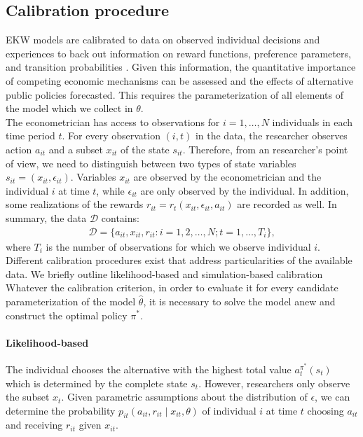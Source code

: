 \subsection{Calibration procedure}\label{Estimation}
EKW models are calibrated to data on observed individual decisions and experiences to back out information on reward functions, preference parameters, and transition probabilities \citep{Davidson.2003,Gourieroux.1996}. Given this information, the quantitative importance of competing economic mechanisms can be assessed and the effects of alternative public policies forecasted. This requires the parameterization of all elements of the model which we collect in $\theta$.\\

\noindent The econometrician has access to observations for $i = 1, \hdots, N$ individuals in each time period $t$. For every observation $(i, t)$ in the data, the researcher observes action $a_{it}$ and a subset $x_{it}$ of the state $s_{it}$. Therefore, from an researcher's point of view, we need to distinguish between two types of state variables $s_{it} = (x_{it}, \epsilon_{it})$. Variables $x_{it}$ are observed by the econometrician and the individual $i$ at time $t$, while $\epsilon_{it}$ are only observed by the individual. In addition, some realizations of the rewards $r_{it} = r_t(x_{it}, \epsilon_{it}, a_{it})$ are recorded as well. In summary, the data $\mathcal{D}$ contains:
%
\begin{align*}
  \mathcal{D} = \{a_{it}, x_{it}, r_{it}: i = 1,2, \hdots, N; t = 1, \hdots, T_i\},
\end{align*}
where $T_i$ is the number of observations for which we observe individual $i$.\\

\noindent Different calibration procedures exist that address particularities of the available data. We briefly outline likelihood-based and simulation-based calibration  Whatever the calibration criterion, in order to evaluate it for every candidate parameterization of the model $\hat{\theta}$, it is necessary to solve the model anew and construct the optimal policy $\pi^*$. 

\paragraph{Likelihood-based} The individual chooses the alternative with the highest total value $a_t^{\pi^*}(s_t)$ which is determined by the complete state $s_t$. However, researchers only observe the subset $x_t$. Given parametric assumptions about the distribution of $\epsilon$, we can determine the probability $p_{it}(a_{it}, r_{it} \mid x_{it}, \theta)$ of individual $i$ at time $t$ choosing $a_{it}$ and receiving $r_{it}$ given $x_{it}$.\\

